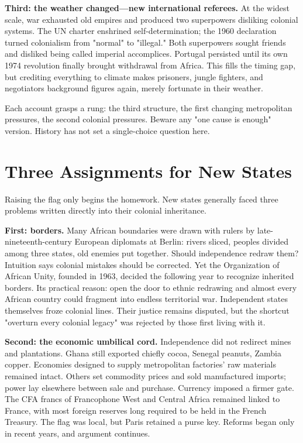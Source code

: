 \textbf{Third: the weather changed---new international referees.} At the widest scale, war exhausted old empires and produced two superpowers disliking colonial systems. The UN charter enshrined self-determination; the 1960 declaration turned colonialism from "normal" to "illegal." Both superpowers sought friends and disliked being called imperial accomplices. Portugal persisted until its own 1974 revolution finally brought withdrawal from Africa. This fills the timing gap, but crediting everything to climate makes prisoners, jungle fighters, and negotiators background figures again, merely fortunate in their weather.

Each account grasps a rung: the third structure, the first changing metropolitan pressures, the second colonial pressures. Beware any "one cause is enough" version. History has not set a single-choice question here.

\section{Three Assignments for New States}
Raising the flag only begins the homework. New states generally faced three problems written directly into their colonial inheritance.

\textbf{First: borders.} Many African boundaries were drawn with rulers by late-nineteenth-century European diplomats at Berlin: rivers sliced, peoples divided among three states, old enemies put together. Should independence redraw them? Intuition says colonial mistakes should be corrected. Yet the Organization of African Unity, founded in 1963, decided the following year to recognize inherited borders. Its practical reason: open the door to ethnic redrawing and almost every African country could fragment into endless territorial war. Independent states themselves froze colonial lines. Their justice remains disputed, but the shortcut "overturn every colonial legacy" was rejected by those first living with it.

\textbf{Second: the economic umbilical cord.} Independence did not redirect mines and plantations. Ghana still exported chiefly cocoa, Senegal peanuts, Zambia copper. Economies designed to supply metropolitan factories' raw materials remained intact. Others set commodity prices and sold manufactured imports; power lay elsewhere between sale and purchase. Currency imposed a firmer gate. The CFA francs of Francophone West and Central Africa remained linked to France, with most foreign reserves long required to be held in the French Treasury. The flag was local, but Paris retained a purse key. Reforms began only in recent years, and argument continues.

